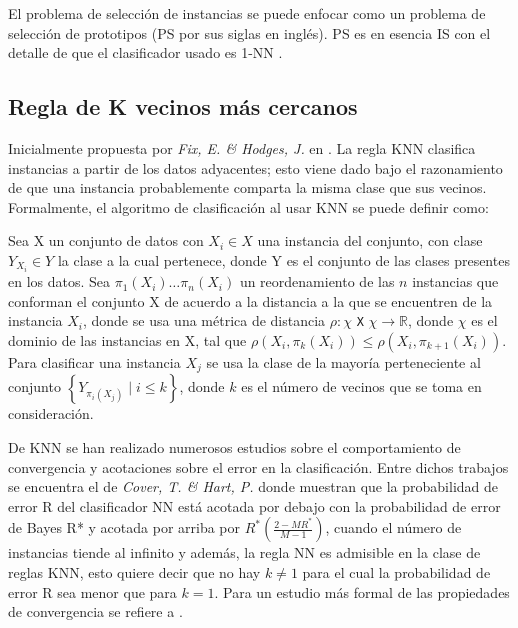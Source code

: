 El problema de selección de instancias se puede enfocar como un problema de selección de prototipos (PS por sus siglas en inglés). PS es en esencia IS con el detalle de que el clasificador usado es 1-NN \cite{garcia2016data}.

\subsection{Regla de K vecinos más cercanos}

Inicialmente propuesta por \emph{Fix, E. \& Hodges, J.} en \cite{fix1951discriminatory}. La regla KNN clasifica instancias a partir de los datos adyacentes; esto viene dado bajo el razonamiento de que una instancia probablemente comparta la misma clase que sus vecinos. Formalmente, el algoritmo de clasificación al usar KNN se puede definir como:\\  

\begin{definicion}
Sea X un conjunto de datos con $X_i\in X$ una instancia del conjunto, con clase $Y_{X_i}\in Y$ la clase a la cual pertenece, donde Y es el conjunto de las clases presentes en los datos. Sea $\pi_1(X_i)\dots \pi_n(X_i)$ un reordenamiento de las $n$ instancias que conforman el conjunto X de acuerdo a la distancia a la que se encuentren de la instancia $X_i$, donde se usa una métrica de distancia  $\rho:\chi$ \texttt{X} $\chi \rightarrow \mathbb{R}$, donde $\chi$ es el dominio de las instancias en X, tal que $\rho(X_i,\pi_k(X_i)) \leq \rho(X_i,\pi_{k+1}(X_i))$. Para clasificar una instancia $X_j$ se usa la clase de la mayoría perteneciente al conjunto $\left\{Y_{\pi_i(X_j)} \mid i \leq k\right\}$, donde $k$ es el número de vecinos que se toma en consideración. \cite{shalev2014understanding}
\end{definicion}

De KNN se han realizado numerosos estudios sobre el comportamiento de convergencia y acotaciones sobre el error en la clasificación. Entre dichos trabajos se encuentra el de \emph{Cover, T. \& Hart, P.} \cite{cover1967nearest} donde muestran que la probabilidad de error R del clasificador NN está acotada por debajo con la probabilidad de error de Bayes R* y acotada por arriba por $R^*(\frac{2-MR^*}{M-1})$, cuando el número de instancias tiende al infinito y además, la regla NN es admisible en la clase de reglas KNN, esto quiere decir que no hay $k\neq 1$ para el cual la probabilidad de error R sea menor que para $k=1$. Para un estudio más formal de las propiedades de convergencia se refiere a \cite{devroye2013probabilistic}.

